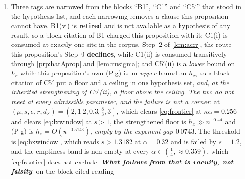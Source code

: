 \begin{remark}\label{rem:phirhyp}
\begin{enumerate}
\item[(1)] Three tags are narrowed from the blocks ``B1'', ``C1'' and ``C5$'$'' that stood in the
hypothesis list, and each narrowing removes a clause this proposition cannot have. B1(vi) is
\textbf{retired} and is not available as a hypothesis of any result, so a block citation of B1 charged
this proposition with it; C1(i) is consumed at exactly one site in the corpus, Step~2 of
\cref{lem:aerr}, the route this proposition's Step~0 \textbf{declines}, while C1(ii) is consumed
transitively through \cref{prp:hatAprop} and \cref{lem:nusigma}; and C5$'$(ii) is a \emph{lower} bound on
$h_x$ while this proposition's own (P-g) is an \emph{upper} bound on $h_x$, so a block citation of C5$'$
put a floor and a ceiling in one hypothesis set, \emph{and, at the inherited strengthening of
C5$'$(ii), a floor above the ceiling}. \emph{The two do not meet at every admissible parameter, and the
failure is not a corner}: at $(\mu,s,a,r,d_Z)=(2,1.2,0.3,\tfrac83,3)$, which clears \eqref{eq:frontier}
at $\kappa\alpha=0.256$ and clears \eqref{eq:lxwindow} at $s>1$, the strengthened floor is
$h_x\gg n^{-0.44}$ and (P-g) is $h_x=O(n^{-0.5143})$, \emph{empty by the exponent gap $0.0743$}. The
threshold is \eqref{eq:hxwindow}, which reads $s>1.3182$ at $\alpha=0.32$ and is failed by $s=1.2$, and
the emptiness band is non-empty at every $\alpha\in(\tfrac14,\approx0.359)$, which \eqref{eq:frontier}
does not exclude.
\emph{\textbf{What follows from that is vacuity, not falsity}}: on the block-cited reading

\end{enumerate}
\end{remark}
